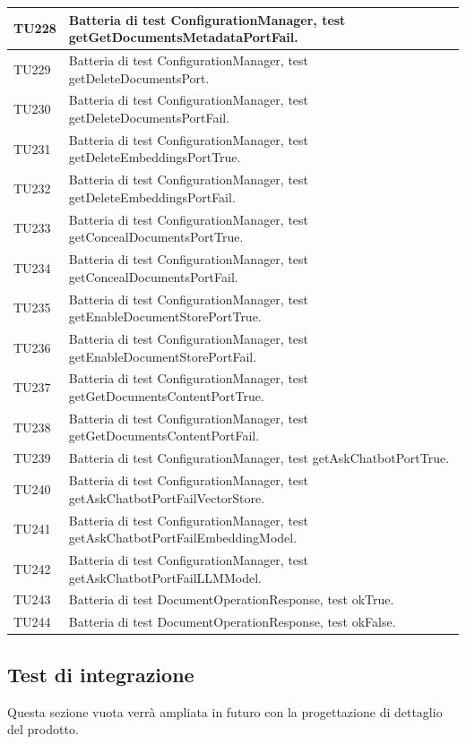 \documentclass[10pt, a4paper]{article}
\begin{document}
\begin{xltabular}{\textwidth}{p{0.12\textwidth}|X}
\hline
TU228 & Batteria di test ConfigurationManager, test getGetDocumentsMetadataPortFail. \\
\hline
TU229 & Batteria di test ConfigurationManager, test getDeleteDocumentsPort. \\
\hline
TU230 & Batteria di test ConfigurationManager, test getDeleteDocumentsPortFail. \\
\hline
TU231 & Batteria di test ConfigurationManager, test getDeleteEmbeddingsPortTrue. \\
\hline
TU232 & Batteria di test ConfigurationManager, test getDeleteEmbeddingsPortFail. \\
\hline
TU233 & Batteria di test ConfigurationManager, test getConcealDocumentsPortTrue. \\
\hline
TU234 & Batteria di test ConfigurationManager, test getConcealDocumentsPortFail. \\
\hline
TU235 & Batteria di test ConfigurationManager, test getEnableDocumentStorePortTrue. \\
\hline
TU236 & Batteria di test ConfigurationManager, test getEnableDocumentStorePortFail. \\
\hline
TU237 & Batteria di test ConfigurationManager, test getGetDocumentsContentPortTrue. \\
\hline
TU238 & Batteria di test ConfigurationManager, test getGetDocumentsContentPortFail. \\
\hline
TU239 & Batteria di test ConfigurationManager, test getAskChatbotPortTrue. \\
\hline
TU240 & Batteria di test ConfigurationManager, test getAskChatbotPortFailVectorStore. \\
\hline
TU241 & Batteria di test ConfigurationManager, test getAskChatbotPortFailEmbeddingModel. \\
\hline
TU242 & Batteria di test ConfigurationManager, test getAskChatbotPortFailLLMModel. \\
\hline
TU243 & Batteria di test DocumentOperationResponse, test okTrue. \\
\hline
TU244 & Batteria di test DocumentOperationResponse, test okFalse. \\
\hline
\end{xltabular}



\subsection{Test di integrazione}
Questa sezione vuota verrà ampliata in futuro con la progettazione di dettaglio del prodotto.
\end{document}
